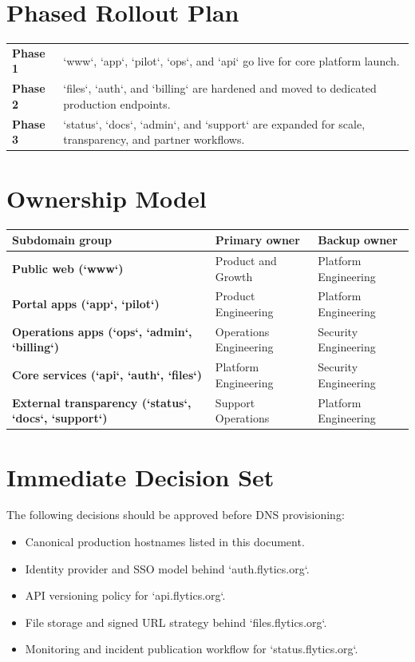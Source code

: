 \documentclass[11pt,a4paper]{article}
\begin{document}
\section{Phased Rollout Plan}

\begin{longtable}{>{\bfseries}p{}p{}}
\toprule
Phase 1 & `www`, `app`, `pilot`, `ops`, and `api` go live for core platform launch. \\
Phase 2 & `files`, `auth`, and `billing` are hardened and moved to dedicated production endpoints. \\
Phase 3 & `status`, `docs`, `admin`, and `support` are expanded for scale, transparency, and partner workflows. \\
\bottomrule
\end{longtable}

\section{Ownership Model}

\begin{longtable}{>{\bfseries}p{}p{}p{}}
\toprule
Subdomain group & Primary owner & Backup owner \\
\midrule
Public web (`www`) & Product and Growth & Platform Engineering \\
Portal apps (`app`, `pilot`) & Product Engineering & Platform Engineering \\
Operations apps (`ops`, `admin`, `billing`) & Operations Engineering & Security Engineering \\
Core services (`api`, `auth`, `files`) & Platform Engineering & Security Engineering \\
External transparency (`status`, `docs`, `support`) & Support Operations & Platform Engineering \\
\bottomrule
\end{longtable}

\section{Immediate Decision Set}

The following decisions should be approved before DNS provisioning:

\begin{itemize}[leftmargin=*]
    \item Canonical production hostnames listed in this document.
    \item Identity provider and SSO model behind `auth.flytics.org`.
    \item API versioning policy for `api.flytics.org`.
    \item File storage and signed URL strategy behind `files.flytics.org`.
    \item Monitoring and incident publication workflow for `status.flytics.org`.
\end{itemize}
\end{document}
